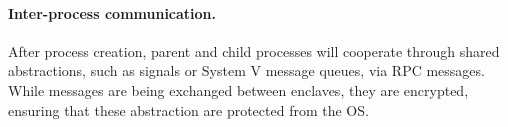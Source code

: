 

\paragraph{Inter-process communication.}
\label{sec:multiproc:ipc}

After process creation, parent and child processes will cooperate
through shared abstractions,
such as signals or System V message queues, via RPC messages.
While messages are being exchanged between enclaves,
they are encrypted, ensuring that these abstraction are protected
from the OS.





